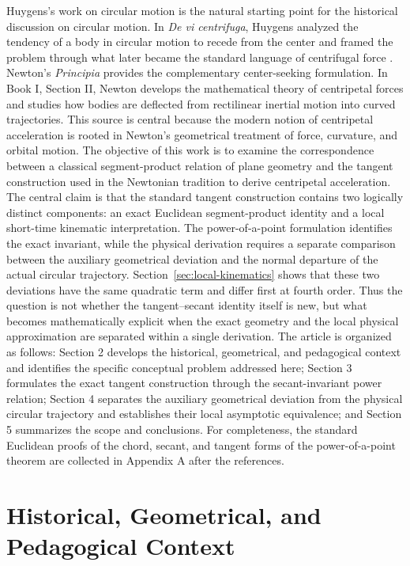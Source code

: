 \documentclass[preprint,12pt,3p,nopreprintline]{elsarticle}
\numberwithin{equation}{section}
\theoremstyle{remark}
\begin{document}
Huygens's work on circular motion is the natural starting point for the historical discussion on circular motion. In \textit{De vi centrifuga}, Huygens analyzed the tendency of a body in circular motion to recede from the center and framed the problem through what later became the standard language of centrifugal force \cite{huygens1888devi, yoder2013catalogue}. Newton's \textit{Principia} \cite{newton1729principia} provides the complementary center-seeking formulation. In Book I, Section II, Newton develops the mathematical theory of centripetal forces and studies how bodies are deflected from rectilinear inertial motion into curved trajectories. This source is central because the modern notion of centripetal acceleration is rooted in Newton's geometrical treatment of force, curvature, and orbital motion. The objective of this work is to examine the correspondence between a classical segment-product relation of plane geometry and the tangent construction used in the Newtonian tradition to derive centripetal acceleration. The central claim is that the standard tangent construction contains two logically distinct components: an exact Euclidean segment-product identity and a local short-time kinematic interpretation. The power-of-a-point formulation identifies the exact invariant, while the physical derivation requires a separate comparison between the auxiliary geometrical deviation and the normal departure of the actual circular trajectory. Section~\ref{sec:local-kinematics} shows that these two deviations have the same quadratic term and differ first at fourth order. Thus the question is not whether the tangent--secant identity itself is new, but what becomes mathematically explicit when the exact geometry and the local physical approximation are separated within a single derivation. The article is organized as follows: Section 2 develops the historical, geometrical, and pedagogical context and identifies the specific conceptual problem addressed here; Section 3 formulates the exact tangent construction through the secant-invariant power relation; Section 4 separates the auxiliary geometrical deviation from the physical circular trajectory and establishes their local asymptotic equivalence; and Section 5 summarizes the scope and conclusions. For completeness, the standard Euclidean proofs of the chord, secant, and tangent forms of the power-of-a-point theorem are collected in Appendix A after the references.

\section{Historical, Geometrical, and Pedagogical Context}
\label{sec:review}
\end{document}
